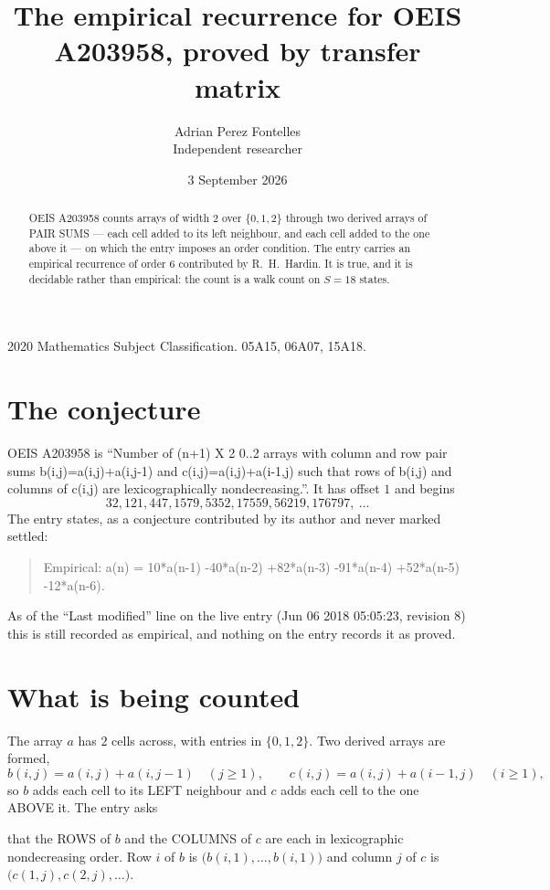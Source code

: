 \documentclass[11pt,a4paper]{article}
\title{The empirical recurrence for OEIS A203958, proved by transfer matrix}
\author{Adrian Perez Fontelles\\ \small Independent researcher}
\date{3 September 2026}
\theoremstyle{plain}
\theoremstyle{definition}
\begin{document}
\maketitle

\begin{abstract}
OEIS A203958 counts arrays of width $2$ over $\{0,1,2\}$ through two derived arrays of PAIR SUMS ---
each cell added to its left neighbour, and each cell added to the one above it --- on which the
entry imposes an order condition. The entry carries an empirical recurrence of order $6$
contributed by R.~H.~Hardin. It is true, and it is decidable rather than empirical: the count is
a walk count on $S=18$ states.
\end{abstract}

\noindent\small 2020 Mathematics Subject Classification. 05A15, 06A07, 15A18.\normalsize

\section{The conjecture}

OEIS A203958 is ``Number of (n+1) X 2 0..2 arrays with column and row pair sums b(i,j)=a(i,j)+a(i,j-1) and c(i,j)=a(i,j)+a(i-1,j) such that rows of b(i,j) and columns of c(i,j) are lexicographically nondecreasing.''. It has offset $1$ and begins
\[
32, 121, 447, 1579, 5352, 17559, 56219, 176797,\ \dots
\]
The entry states, as a conjecture contributed by its author and never marked settled:
\begin{quote}
Empirical: a(n) = 10*a(n-1) -40*a(n-2) +82*a(n-3) -91*a(n-4) +52*a(n-5) -12*a(n-6).
\end{quote}
As of the ``Last modified'' line on the live entry (Jun 06 2018 05:05:23, revision 8) this is still
recorded as empirical, and nothing on the entry records it as proved.

\section{What is being counted}

The array $a$ has $2$ cells across, with entries in $\{0,1,2\}$. Two derived arrays are formed,
\[
b(i,j)=a(i,j)+a(i,j-1)\quad(j\ge1),\qquad c(i,j)=a(i,j)+a(i-1,j)\quad(i\ge1),
\]
so $b$ adds each cell to its LEFT neighbour and $c$ adds each cell to the one ABOVE it. The
entry asks

that the ROWS of $b$ and the COLUMNS of $c$ are each in lexicographic nondecreasing order. Row $i$ of $b$
is $\bigl(b(i,1),\dots,b(i,1)\bigr)$ and column $j$ of $c$ is
$\bigl(c(1,j),c(2,j),\dots\bigr)$.
\end{document}

